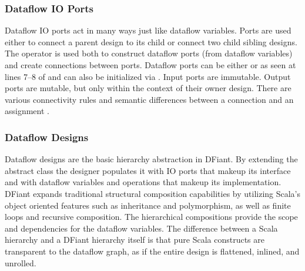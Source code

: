 \subsubsection{Dataflow IO Ports} 
\label{sec:io_ports}
Dataflow IO ports act in many ways just like dataflow variables. 
Ports are used either to connect a parent design to its child or connect two child sibling designs. The operator \code{<>} is used both to construct dataflow ports (from dataflow variables) and create connections between ports. 
Dataflow ports can be either  or  as seen at lines 7--8 of  and can also be initialized via . Input ports are immutable. Output ports are mutable, but only within the context of their owner design.  
There are various connectivity rules and semantic differences between a connection \code{<>} and an assignment \code{:=}.

\subsubsection{Dataflow Designs} 
Dataflow designs are the basic hierarchy abstraction in DFiant. By extending the abstract class  the designer populates it with IO ports that makeup its interface and with dataflow variables and operations that makeup its implementation.
DFiant expands traditional structural composition capabilities by utilizing Scala's object oriented features such as inheritance and polymorphism, as well as finite loops and recursive composition. The hierarchical compositions provide the scope and dependencies for the dataflow variables. The difference between a Scala hierarchy and a DFiant hierarchy itself is that pure Scala constructs are transparent to the dataflow graph, as if the entire design is flattened, inlined, and unrolled. 



